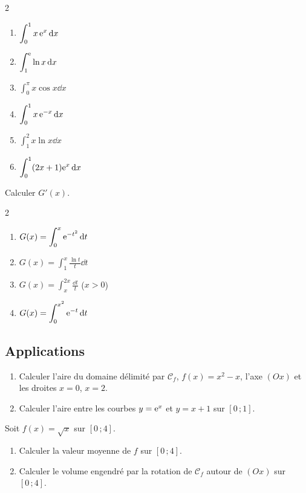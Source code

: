 \begin{multicols}{2}
\begin{enumerate}
	\item $\displaystyle\int_0^{1}x\,\mathrm{e}^{x}\,\mathrm{d} x$
	\item $\displaystyle\int_1^{\mathrm{e}}\ln x\,\mathrm{d} x$
	\item $\displaystyle\int_0^{\pi}x\cos x\dd x$
	\item $\displaystyle\int_0^{1}x\,\mathrm{e}^{-x}\,\mathrm{d} x$
	\item $\displaystyle\int_1^{2}x\ln x\dd x$
	\item $\displaystyle\int_0^{1}(2x+1)\mathrm{e}^{x}\,\mathrm{d} x$
\end{enumerate}
\end{multicols}

Calculer $G'(x)$.
\begin{multicols}{2}
\begin{enumerate}
	\item $G(x)=\displaystyle\int_0^{x}\mathrm{e}^{-t^{2}}\,\mathrm{d} t$
	\item $G(x)=\displaystyle\int_1^{x}\frac{\ln t}{t}\dd t$
	\item $G(x)=\displaystyle\int_{x}^{2x}\frac{\dd t}{t}$ \; ($x>0$)
	\item $G(x)=\displaystyle\int_0^{x^{2}}\mathrm{e}^{-t}\,\mathrm{d} t$
\end{enumerate}
\end{multicols}

\subsection{Applications}

\begin{enumerate}
	\item Calculer l'aire du domaine délimité par $\mathcal C_f$, $f(x)=x^{2}-x$,
	l'axe $(Ox)$ et les droites $x=0$, $x=2$.
	\item Calculer l'aire entre les courbes $y=\mathrm{e}^{x}$ et $y=x+1$ sur $[0\,;1]$.
\end{enumerate}

Soit $f(x)=\sqrt{x}$ sur $[0\,;4]$.
\begin{enumerate}
	\item Calculer la valeur moyenne de $f$ sur $[0\,;4]$.
	\item Calculer le volume engendré par la rotation de $\mathcal C_f$ autour
	de $(Ox)$ sur $[0\,;4]$.
\end{enumerate}

